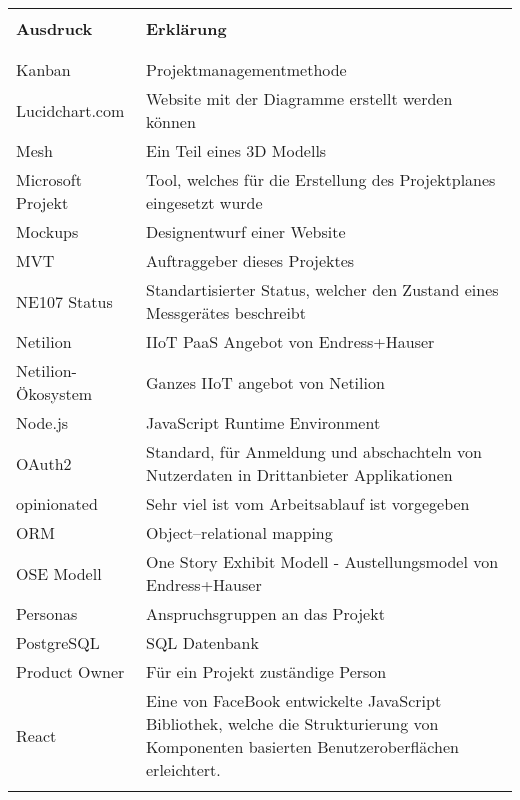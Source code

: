 \begin{table}[H]
  \begin{tabularx}{\textwidth}{l X}\hline \\
  \textbf{Ausdruck} & \textbf{Erklärung}  \\ \\\hline \\
  Kanban & Projektmanagementmethode \\
  Lucidchart.com & Website mit der Diagramme erstellt werden können \\
  Mesh & Ein Teil eines 3D Modells \\
  Microsoft Projekt & Tool, welches für die Erstellung des Projektplanes eingesetzt wurde \\
  Mockups & Designentwurf einer Website \\
  MVT & Auftraggeber dieses Projektes \\
  NE107 Status & Standartisierter Status, welcher den Zustand eines Messgerätes beschreibt \\
  Netilion & IIoT PaaS Angebot von Endress+Hauser \\
  Netilion-Ökosystem & Ganzes IIoT angebot von Netilion \\
  Node.js & JavaScript Runtime Environment \\
  OAuth2 & Standard, für Anmeldung und abschachteln von Nutzerdaten in Drittanbieter Applikationen \\
  opinionated & Sehr viel ist vom Arbeitsablauf ist vorgegeben \\
  ORM & Object–relational mapping \\
  OSE Modell & One Story Exhibit Modell - Austellungsmodel von Endress+Hauser \\
  Personas & Anspruchsgruppen an das Projekt \\
  PostgreSQL & SQL Datenbank \\
  Product Owner & Für ein Projekt zuständige Person \\
  React & Eine von FaceBook entwickelte JavaScript Bibliothek, welche die Strukturierung von Komponenten basierten Benutzeroberflächen erleichtert. \\
  \\\hline
  \end{tabularx}
\end{table}
\pagebreak
